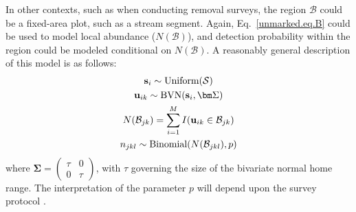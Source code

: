In other contexts, such as when conducting removal surveys, the region
$\mathcal{B}$ could be a fixed-area plot, such as a stream
segment. Again, Eq.~\ref{unmarked.eq.B} could be used to model local
abundance ($N(\mathcal{B})$), and detection probability within the region could be
modeled conditional on $N(\mathcal{B})$. %
A reasonably general description of this model is as
follows:
\begin{gather*}
  {\bf s}_i \sim \text{Uniform}(\mathcal{S}) \\
  {\bf u}_{ik} \sim \text{BVN}({\bf s}_i, {\bm \Sigma}) \\
  N(\mathcal{B}_{jk}) = \sum_{i=1}^M I({\bf u}_{ik} \in \mathcal{B}_{jk}) \\
  n_{jkl} \sim \text{Binomial}(N(\mathcal{B}_{jkl}), p)
\end{gather*}
where ${\bm \Sigma} = \begin{pmatrix} \tau & 0 \\ 0 &
  \tau \end{pmatrix}$, with $\tau$ governing the size of the bivariate
normal home range.
The interpretation of the parameter $p$ will depend upon the
survey protocol \citep{nichols_etal:2009}.

